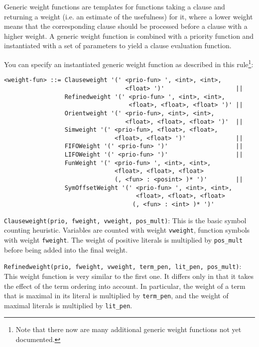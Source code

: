 \documentclass{article}
\begin{document}
Generic weight functions are templates for functions taking a clause
and returning a weight (i.e. an estimate of the usefulness) for it,
where a lower weight means that the corresponding clause should be
processed before a clause with a higher weight.  A generic weight
function is combined with a priority function and instantiated with a
set of parameters to yield a clause evaluation function.

You can specify an instantiated generic weight function as described
in this rule\footnote{Note that there now are many additional generic
  weight functions not yet documented.}:

\small
\begin{verbatim}
<weight-fun> ::= Clauseweight '(' <prio-fun> ', <int>, <int>,
                                  <float> ')'                    ||
                 Refinedweight '(' <prio-fun> ', <int>, <int>,
                                   <float>, <float>, <float> ')' ||
                 Orientweight '(' <prio-fun>, <int>, <int>,       
                                  <float>, <float>, <float> ')'  ||
                 Simweight '(' <prio-fun>, <float>, <float>,        
                               <float>, <float> ')'              ||
                 FIFOWeight '(' <prio-fun> ')'                   ||
                 LIFOWeight '(' <prio-fun> ')'                   ||
                 FunWeight '(' <prio-fun> ', <int>, <int>,
                               <float>, <float>, <float> 
                               (, <fun> : <posint> )* ')'        ||
                 SymOffsetWeight '(' <prio-fun> ', <int>, <int>,
                                     <float>, <float>, <float> 
                                    (, <fun> : <int> )* ')'
\end{verbatim}
\normalsize

\medskip
\noindent{}\texttt{Clauseweight(prio, fweight, vweight, pos\_mult)}:
This is the basic symbol counting heuristic. Variables are counted
with weight \texttt{vweight}, function symbols with weight
\texttt{fweight}. The weight of positive literals is multiplied by
\texttt{pos\_mult} before being added into the final weight.

\medskip
\begin{sloppypar}
\noindent{}\texttt{Refinedweight(prio, fweight, vweight,
    term\_pen, lit\_pen, pos\_mult)}: 
This weight function is very similar to the first one. It differs only
in that it takes the effect of the term ordering into account. In
particular, the weight of a term that is maximal in its literal is
multiplied by \texttt{term\_pen}, and the weight of maximal
literals is multiplied by \texttt{lit\_pen}.
\end{sloppypar}
\end{document}
